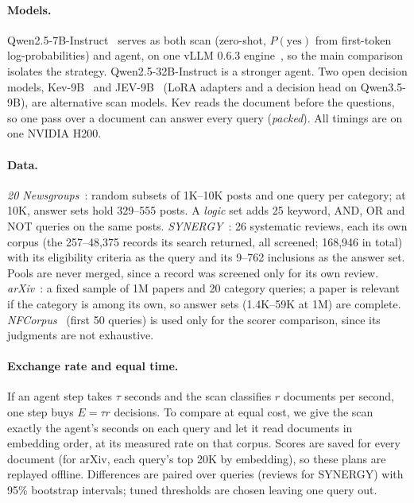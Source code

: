 \documentclass[sigconf,nonacm]{acmart}
\begin{document}
\paragraph{Models.}
Qwen2.5-7B-Instruct~\cite{qwen2025qwen25} serves as both scan (zero-shot,
$P(\text{yes})$ from first-token log-probabilities) and agent, on one vLLM 0.6.3
engine~\cite{kwon2023vllm}, so the main comparison isolates the strategy.
Qwen2.5-32B-Instruct is a stronger agent. Two open decision models,
Kev-9B~\cite{kev} and JEV-9B~\cite{jev9b} (LoRA adapters and a decision head on
Qwen3.5-9B), are alternative scan models. Kev reads the document before the
questions, so one pass over a document can answer every query
(\emph{packed}). All timings are on one NVIDIA H200.

\paragraph{Data.}
\emph{20 Newsgroups}~\cite{lang1995newsweeder}: random subsets of 1K--10K posts
and one query per category; at 10K, answer sets hold 329--555 posts. A
\emph{logic} set adds 25 keyword, AND, OR and NOT queries on the same posts.
\emph{SYNERGY}~\cite{debruin2023synergy}: 26 systematic reviews, each its own
corpus (the 257--48{,}375 records its search returned, all screened; 168{,}946 in
total) with its eligibility criteria as the query and its 9--762 inclusions as
the answer set. Pools are never merged, since a record was screened only for its
own review. \emph{arXiv}~\cite{clement2019arxiv}: a fixed sample of 1M papers
and 20 category queries; a paper is relevant if the category is among its own,
so answer sets (1.4K--59K at 1M) are complete. \emph{NFCorpus}~\cite{boteva2016nfcorpus}
(first 50 queries) is used only for the scorer comparison, since its judgments
are not exhaustive.

\paragraph{Exchange rate and equal time.}
If an agent step takes $\tau$ seconds and the scan classifies $r$ documents per
second, one step buys $E = \tau r$ decisions. To compare at equal cost, we give
the scan exactly the agent's seconds on each query and let it read documents in
embedding order, at its measured rate on that corpus. Scores are saved for every
document (for arXiv, each query's top 20K by embedding), so these plans are
replayed offline. Differences are paired over queries (reviews for SYNERGY) with
95\% bootstrap intervals; tuned thresholds are chosen leaving one query out.
\end{document}
